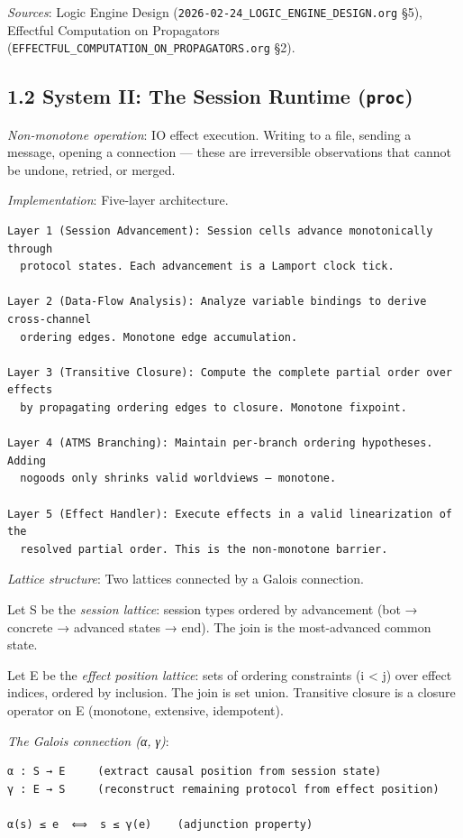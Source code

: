 \documentclass[11pt]{article}
\begin{document}
\emph{Sources}: Logic Engine Design (\texttt{2026-02-24\_LOGIC\_ENGINE\_DESIGN.org} §5),
Effectful Computation on Propagators (\texttt{EFFECTFUL\_COMPUTATION\_ON\_PROPAGATORS.org} §2).
\subsection{1.2 System II: The Session Runtime (\texttt{proc})}
\label{sec:org090afd4}

\emph{Non-monotone operation}: IO effect execution. Writing to a file, sending a
message, opening a connection — these are irreversible observations that cannot
be undone, retried, or merged.

\emph{Implementation}: Five-layer architecture.

\begin{verbatim}
Layer 1 (Session Advancement): Session cells advance monotonically through
  protocol states. Each advancement is a Lamport clock tick.

Layer 2 (Data-Flow Analysis): Analyze variable bindings to derive cross-channel
  ordering edges. Monotone edge accumulation.

Layer 3 (Transitive Closure): Compute the complete partial order over effects
  by propagating ordering edges to closure. Monotone fixpoint.

Layer 4 (ATMS Branching): Maintain per-branch ordering hypotheses. Adding
  nogoods only shrinks valid worldviews — monotone.

Layer 5 (Effect Handler): Execute effects in a valid linearization of the
  resolved partial order. This is the non-monotone barrier.
\end{verbatim}

\emph{Lattice structure}: Two lattices connected by a Galois connection.

Let S be the \emph{session lattice}: session types ordered by advancement (bot →
concrete → advanced states → end). The join is the most-advanced common state.

Let E be the \emph{effect position lattice}: sets of ordering constraints (i < j)
over effect indices, ordered by inclusion. The join is set union. Transitive
closure is a closure operator on E (monotone, extensive, idempotent).

\emph{The Galois connection (α, γ)}:

\begin{verbatim}
α : S → E     (extract causal position from session state)
γ : E → S     (reconstruct remaining protocol from effect position)

α(s) ≤ e  ⟺  s ≤ γ(e)    (adjunction property)
\end{verbatim}
\end{document}
